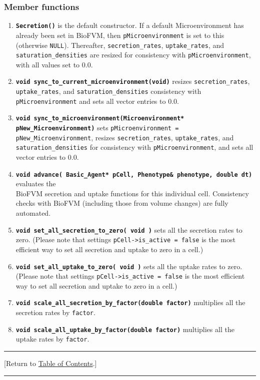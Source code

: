 \documentclass[12pt]{article}
\renewcommand{\v}{\verb}
\newcommand{\smallcode}[1]{\textbf{\texttt{#1}}}
\newcommand{\TOClink}{\begin{center}\hrule\vskip-10pt\phantom{.}\hfill[Return to \hyperlink{TOC}{Table of Contents}.]\hfill\phantom{.}\vskip3pt\hrule\end{center}}
\begin{document}
\subsubsection{Member functions}
\begin{enumerate}
\item 
\smallcode{Secretion()} is the default constructor. If a default Microenvironment has already 
been set in BioFVM, then \v|pMicroenvironment| is set to this (otherwise \v|NULL|). 
Thereafter, \v|secretion_rates|, \v|uptake_rates|, and \v|saturation_densities| are resized for consistency with \v|pMicroenvironment|, with all values 
set to 0.0.

\item
\smallcode{void sync\_to\_current\_microenvironment(void)} resizes 
\v|secretion_rates|, \v|uptake_rates|, and \v|saturation_densities| 
consistency with \v|pMicroenvironment| and sets all vector entries to 0.0. 

\item
\smallcode{void sync\_to\_microenvironment(Microenvironment* pNew\_Microenvironment)}
sets \hfill\break \v|pMicroenvironment = pNew_Microenvironment|, resizes 
\v|secretion_rates|, \v|uptake_rates|, and \hfill\break \v|saturation_densities| 
for consistency with \v|pMicroenvironment|, and sets all vector entries to 0.0. 

\item 
\smallcode{void advance( Basic\_Agent* pCell, Phenotype\& phenotype, 
double dt)} evaluates the \\ BioFVM secretion and uptake functions 
for this individual cell. Consistency checks with BioFVM (including 
those from volume changes) are fully automated. 

\item 
\smallcode{void set\_all\_secretion\_to\_zero( void )} sets all the 
secretion rates to zero. (Please note that settings 
\v|pCell->is_active = false| is the most efficient way to set 
all secretion and uptake to zero in a cell.) 

\item 
\smallcode{void set\_all\_uptake\_to\_zero( void )} sets all the 
uptake rates to zero. (Please note that settings 
\v|pCell->is_active = false| is the most efficient way to set 
all secretion and uptake to zero in a cell.) 

\item 
\smallcode{void scale\_all\_secretion\_by\_factor(double factor)} multiplies 
all the secretion rates by \v|factor|. 

\item 
\smallcode{void scale\_all\_uptake\_by\_factor(double factor)} multiplies 
all the uptake rates by \v|factor|. 

\end{enumerate}
\TOClink
\end{document}
